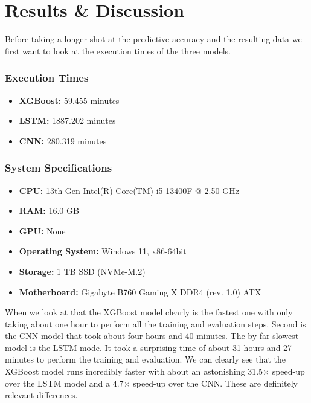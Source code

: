 \documentclass[a4paper,12pt]{report}
\begin{document}
\chapter{Results \& Discussion}
Before taking a longer shot at the predictive accuracy and the resulting data we first want to look at the execution times of the three models.\\

\subsection*{Execution Times}
\begin{itemize}
  \item \textbf{XGBoost:} 59.455 minutes
  \item \textbf{LSTM:} 1887.202 minutes
  \item \textbf{CNN:} 280.319 minutes
\end{itemize}

\subsection*{System Specifications}
\begin{itemize}
  \item \textbf{CPU:} 13th Gen Intel(R) Core(TM) i5-13400F @ 2.50 GHz
  \item \textbf{RAM:} 16.0 GB
  \item \textbf{GPU:} None
  \item \textbf{Operating System:} Windows 11, x86-64bit
  \item \textbf{Storage:} 1 TB SSD (NVMe-M.2)
  \item \textbf{Motherboard:} Gigabyte B760 Gaming X DDR4 (rev. 1.0) ATX
\end{itemize}

When we look at that the XGBoost model clearly is the fastest one with only taking about one hour to perform all the training and evaluation steps. Second is the CNN model that took about four hours and 40 minutes. The by far slowest model is the LSTM mode. It took a surprising time of about 31 hours and 27 minutes to perform the training and evaluation. We can clearly see that the XGBoost model runs incredibly faster with about an astonishing 31.5$\times$ speed-up over the LSTM model and a 4.7$\times$ speed-up over the CNN. These are definitely relevant differences.\\


\newpage
\end{document}

